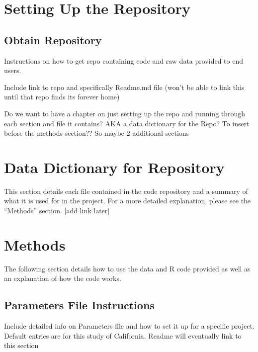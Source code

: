 \documentclass[
]{book}
\begin{document}
\hypertarget{setting-up-the-repository}{%
\chapter{Setting Up the Repository}\label{setting-up-the-repository}}

\hypertarget{obtain-repository}{%
\section{Obtain Repository}\label{obtain-repository}}

Instructions on how to get repo containing code and raw data provided to end users.

Include link to repo and specifically Readme.md file (won't be able to link this until that repo finds its forever home)

Do we want to have a chapter on just setting up the repo and running through each section and file it contains? AKA a data dictionary for the Repo? To insert before the methods section??
So maybe 2 additional sections

\hypertarget{data-dictionary-for-repository}{%
\chapter{Data Dictionary for Repository}\label{data-dictionary-for-repository}}

This section details each file contained in the code repository and a summary of what it is used for in the project. For a more detailed explanation, please see the ``Methods'' section. {[}add link later{]}

\hypertarget{methods}{%
\chapter{Methods}\label{methods}}

The following section details how to use the data and R code provided as well as an explanation of how the code works.

\hypertarget{parameters-file-instructions}{%
\section{Parameters File Instructions}\label{parameters-file-instructions}}

Include detailed info on Parameters file and how to set it up for a specific project. Default entries are for this study of California.
Readme will eventually link to this section
\end{document}
